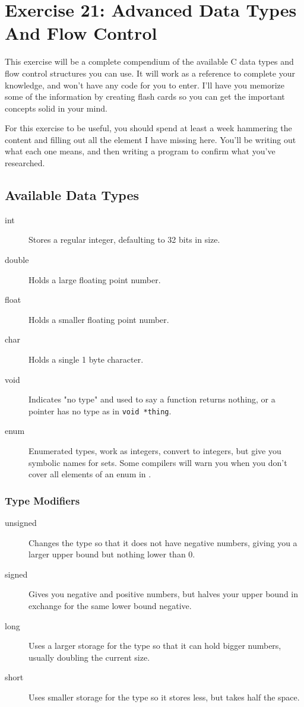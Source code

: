 \chapter{Exercise 21: Advanced Data Types And Flow Control}

This exercise will be a complete compendium of the available C data types and
flow control structures you can use.  It will work as a reference to complete
your knowledge, and won't have any code for you to enter.  I'll have you
memorize some of the information by creating flash cards so you can get 
the important concepts solid in your mind.

For this exercise to be useful, you should spend at least a week hammering 
the content and filling out all the element I have missing here.  You'll be
writing out what each one means, and then writing a program to confirm
what you've researched.


\section{Available Data Types}

\begin{description}
\item[int] Stores a regular integer, defaulting to 32 bits in size.
\item[double] Holds a large floating point number.
\item[float] Holds a smaller floating point number.
\item[char] Holds a single 1 byte character.
\item[void] Indicates "no type" and used to say a function returns
    nothing, or a pointer has no type as in \verb|void *thing|.
\item[enum] Enumerated types, work as integers, convert to integers,
    but give you symbolic names for sets.  Some compilers will warn
    you when you don't cover all elements of an enum in .
\end{description}

\subsection{Type Modifiers}

\begin{description}
\item[unsigned] Changes the type so that it does not have negative numbers,
    giving you a larger upper bound but nothing lower than 0.
\item[signed] Gives you negative and positive numbers, but halves your 
    upper bound in exchange for the same lower bound negative.
\item[long] Uses a larger storage for the type so that it can hold
    bigger numbers, usually doubling the current size.
\item[short] Uses smaller storage for the type so it stores less, but
    takes half the space.
\end{description}


